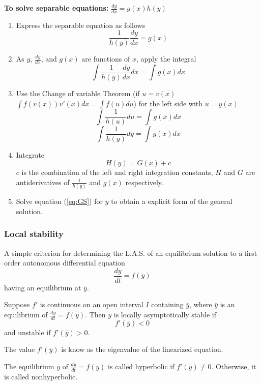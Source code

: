{\bf To solve separable equations: }
$\frac{dy}{dx}=g(x)h(y)$
\begin{enumerate}
\item Express the separable equation as follows
$$\frac{1}{h(y)}\frac{dy}{dx}=g(x)$$
\item As $y$, $\frac{dy}{dx}$, and $g(x)$ are functions of $x$,
apply the integral
$$\int \frac{1}{h(y)}\frac{dy}{dx} dx=\int g(x) dx$$
\item Use the Change of variable Theorem (if $u=v(x)$ $\int f(v(x))v'(x)dx=\int
f(u)du$) for the left side with $u=y(x)$
$$\int \frac{1}{h(u)}du=\int g(x) dx$$
$$\int \frac{1}{h(y)}dy=\int g(x) dx$$
\item Integrate
\begin{equation}H(y)=G(x)+c\label{eq:GS}\end{equation} $c$ is the combination of the left
and right integration constants, $H$ and $G$ are antiderivatives of
$\frac{1}{h(y)}$ and $g(x)$ respectively. \item Solve equation
(\ref{eq:GS}) for $y$ to obtain a explicit form of the general
solution.
\end{enumerate}



\subsubsection{Local stability}
A simple criterion for determining the L.A.S. of an equilibrium solution to a first order autonomous differential equation
\begin{equation}
\label{eq:ODE1Nonlin}
\frac{dy}{dt}=f(y)
\end{equation}
having an equilibrium at $\bar y$.


\begin{theorem}
Suppose $f'$ is continuous on an open interval $I$ containing $\bar y$, where $\bar y$ is an equilibrium of $\frac{dy}{dt}=f(y)$. Then $\bar y$ is locally asymptotically stable if $$f'(\bar y)<0$$
and unstable if $f'(\bar y)>0$.
\end{theorem}

The value $f'(\bar y)$ is know as the eigenvalue of the linearized equation.


\begin{definition}
The equilibrium $\bar y$ of $\frac{dy}{dt}=f(y)$ is called hyperbolic if $f'(\bar y)\not =0$. Otherwise, it is called nonhyperbolic.
\end{definition}


